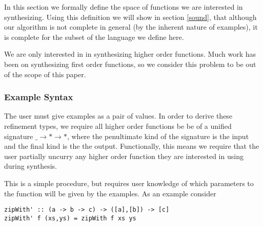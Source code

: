 In this section we formally define the space of functions we are interested in synthesizing. Using this definition we will show in section \ref{sound}, that although our algorithm is not complete in general (by the inherent nature of examples), it is complete for the subset of the language we define here.

We are only interested in in synthesizing higher order functions. Much work has been on synthesizing first order functions, so we consider this problem to be out of the scope of this paper.


\subsubsection{Example Syntax}
The user must give examples as a pair of values. 
In order to derive these refinement types, we require all higher order functions be be of a unified signature \texttt{$\_ \to * \to *$}, where the penultimate kind of the signature is the input and the final kind is the the output.  Functionally, this means we require that the user partially uncurry any higher order function they are interested in using during synthesis.

This is a simple procedure, but requires user knowledge of which parameters to the function will be given by the examples. 
As an example consider 

\begin{lstlisting}
zipWith' :: (a -> b -> c) -> ([a],[b]) -> [c]
zipWith' f (xs,ys) = zipWith f xs ys
\end{lstlisting}
